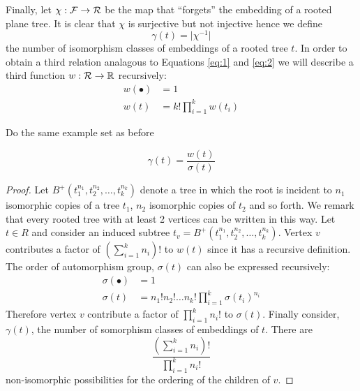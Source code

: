 Finally, let $\chi: \operatorname{\mathcal{F}} \rightarrow \operatorname{\mathcal{R}}$ be the map that ``forgets'' the embedding of a rooted plane tree.  It is clear that $\chi$ 
is surjective but not injective hence we define
\[
 \gamma(t) = \lvert \chi^{-1} \rvert 
\]
the number of isomorphism classes of embeddings of a rooted tree $t$.  In order to obtain a third relation analagous to Equations 
\ref{eq:1} and \ref{eq:2} we will describe a third function $w: \operatorname{\mathcal{R}} \rightarrow \mathbb{R}$ recursively:
\begin{align}
 w(\bullet) &= 1  \\ 
 w(t)  &= k!\prod_{i=1}^{k}w(t_i) 
\end{align}
\begin{ex}
 Do the same example set as before
\end{ex}

\begin{lem}
 \begin{equation}
  \gamma(t) = \frac{w(t)}{\sigma(t)}
 \end{equation}
\end{lem}
\begin{proof}
 Let $B^{+}(t_1^{n_1},t_2^{n_2},\dots,t_k^{n_k})$ denote a tree in which the root is incident to $n_1$ isomorphic copies 
 of a tree $t_1$, $n_2$ isomorphic copies of $t_2$ and so forth.  We remark that every rooted tree with at least 2 vertices can 
 be written in this way.  Let $t  \in R$ and consider an induced subtree $t_v = B^{+}(t_1^{n_1},t_2^{n_2},\dots,t_k^{n_k})$. 
 Vertex $v$ contributes a factor of $\left( \sum_{i=1}^k n_i \right)! $ to $w(t)$ since it has a recursive definition.  The order of 
 automorphism group, $\sigma(t)$ can also be expressed recursively:
 \begin{align}
  \sigma(\bullet) &= 1 \\
  \sigma(t) &= n_1 ! n_2! \dots n_k ! \prod_{i=1}^k\sigma(t_i)^{n_i} 
 \end{align}
Therefore vertex $v$ contribute a factor of $\prod_{i=1}^k n_i !$ to $\sigma(t)$.  Finally consider, $\gamma(t)$, the number of somorphism classes of embeddings of $t$.  
There are 
\[
 \frac{\left(\sum_{i=1}^k n_i \right)!}{\prod_{i=1}^k n_i!}
\]
non-isomorphic possibilities for the ordering of the children of $v$.
\end{proof}

